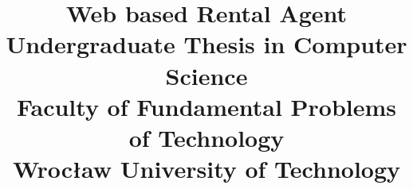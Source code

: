 \documentclass[10pt,a4paper]{report}
\begin{document}
\begin{titlepage}
\title{Web based Rental Agent\\
	\small{
	Undergraduate Thesis in Computer Science\\
	Faculty of Fundamental Problems of Technology\\
	Wrocław University of Technology}}
\date{}

\end{titlepage}
\maketitle
\tableofcontents
\newpage



\end{document}
